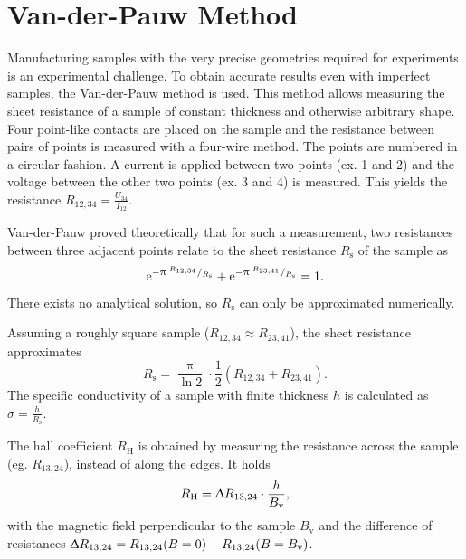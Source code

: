 \section{Van-der-Pauw Method}\label{sec:van-der-pauw-geometry}
Manufacturing samples with the very precise geometries required for experiments is an experimental challenge.
To obtain accurate results even with imperfect samples, the Van-der-Pauw method is used.
This method allows measuring the sheet resistance of a sample of constant thickness and otherwise arbitrary shape.
Four point-like contacts are placed on the sample and the resistance between pairs of points is measured with a four-wire method.
The points are numbered in a circular fashion.
A current is applied between two points (ex. 1 and 2) and the voltage between the other two points (ex. 3 and 4) is measured.
This yields the resistance $R_{12,34} = \frac{U_{34}}{I_{12}}$.

Van-der-Pauw proved theoretically that for such a measurement, two resistances between three adjacent points relate to the sheet resistance $R_\text{s}$ of the sample as
\begin{equation}
	\mathrm{e}^{- \uppi \; ^{R_{12,34}}/_{R_\text{s}}} + \mathrm{e}^{- \uppi \; ^{R_{23,41}}/_{R_\text{s}}} = 1.
\end{equation}
There exists no analytical solution, so $R_\text{s}$ can only be approximated numerically.

Assuming a roughly square sample ($R_{12,34} \approx R_{23,41}$), the sheet resistance approximates
\begin{equation*}
	R_\text{s} = \frac{\uppi}{\ln 2} \cdot \frac{1}{2} \left( R_{12,34} + R_{23,41} \right).
\end{equation*}
The specific conductivity of a sample with finite thickness $h$ is calculated as $\sigma = \frac{h}{R_\text{s}}$.

The hall coefficient $R_\text{H}$ is obtained by measuring the resistance across the sample (eg. $R_{13,24}$), instead of along the edges.
It holds
\begin{equation*}
	R_\text{H} = \Updelta R_{13,24} \cdot \frac{h}{B_\text{v}},
\end{equation*}
with the magnetic field perpendicular to the sample $B_\text{v}$ and the difference of resistances $\Updelta R_{13,24} = R_{13,24}(B = 0) - R_{13,24}(B = B_\text{v})$.
